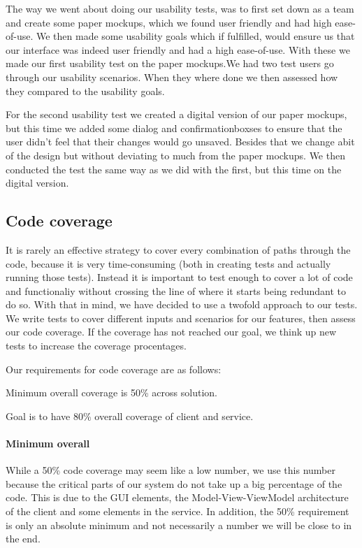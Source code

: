 The way we went about doing our usability tests, was to first set down as a team and create some paper mockups, which we found user friendly and had high ease-of-use. We then made some usability goals which if fulfilled, would ensure us that our interface was indeed user friendly and had a high ease-of-use. With these we made our first usability test on the paper mockups.We had two test users go through our usability scenarios. When they where done we then assessed how they compared to the usability goals.

For the second usability test we created a digital version of our paper mockups, but this time we added some dialog and confirmationboxses to ensure that the user didn't feel that their changes would go unsaved. Besides that we change abit of the design but without deviating to much from the paper mockups. We then conducted the test the same way as we did with the first, but this time on the digital version.

\subsection{Code coverage}
\label{Testing_Strategy_Coverage}
It is rarely an effective strategy to cover every combination of paths through the code, because it is very time-consuming (both in creating tests and actually running those tests). Instead it is important to test enough to cover a lot of code and functionaliy without crossing the line of where it starts being redundant to do so\cite{WoT}. With that in mind, we have decided to use a twofold approach to our tests. We write tests to cover different inputs and scenarios for our features, then assess our code coverage. If the coverage has not reached our goal, we think up new tests to increase the coverage procentages.

Our requirements for code coverage are as follows:
\begin{my_itemize}
\item Minimum overall coverage is 50\% across solution.
\item Goal is to have 80\% overall coverage of client and service.
\end{my_itemize}

\paragraph{Minimum overall}
While a 50\% code coverage may seem like a low number, we use this number because the critical parts of our system do not take up a big percentage of the code. This is due to the GUI elements, the Model-View-ViewModel architecture of the client and some elements in the service. In addition, the 50\% requirement is only an absolute minimum and not necessarily a number we will be close to in the end.

